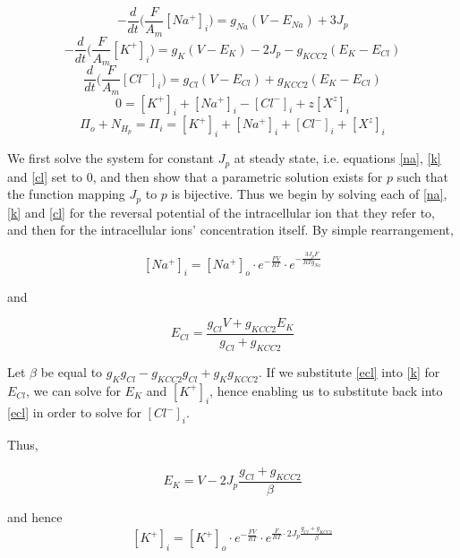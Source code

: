 \documentclass[a4paper,11pt]{article}
\begin{document}
\begin{equation} \label{na} \tag{S1}
-\frac{d}{dt}\bigg(\frac{F}{A_m}[Na^+]_i\bigg) =g_{Na}(V-E_{Na})+3J_p
\end{equation}
\begin{equation} \label{k} \tag{S2}
-\frac{d}{dt}\bigg(\frac{F}{A_m}[K^+]_i\bigg) = g_K(V-E_{K})-2J_p-g_{KCC2}(E_K-E_{Cl})
\end{equation}
\begin{equation} \label{cl} \tag{S3}
\frac{d}{dt}\bigg(\frac{F}{A_m}[Cl^-]_i\bigg) = g_{Cl}(V-E_{Cl})+g_{KCC2}(E_K-E_{Cl})
\end{equation}
\begin{equation} \label{in} \tag{S4}
0=[K^+]_i+[Na^+]_i-[Cl^-]_i+z[X^z]_i
\end{equation}
\begin{equation} \label{osmo} \tag{S5}
\Pi_o+N_{H_p} = \Pi_i=[K^+]_i+[Na^+]_i+[Cl^-]_i+[X^z]_i
\end{equation}

We first solve the system for constant $J_p$ at steady state, i.e. equations \ref{na}, \ref{k} and \ref{cl} set to 0, and then show that a parametric solution exists for $p$ such that the function mapping $J_p$ to $p$ is bijective. Thus we begin by solving each of \eqref{na}, \eqref{k} and \eqref{cl} for the reversal potential of the intracellular ion that they refer to, and then for the intracellular ions' concentration itself. By simple rearrangement,

\begin{equation} \label{nai} \tag{S6}
[Na^+]_i = [Na^+]_o \cdot e^{-\frac{FV}{RT}} \cdot e^{-\frac{3J_pF}{RTg_{Na}}} 
\end{equation}

and

\begin{equation} \label{ecl} \tag{S7}
E_{Cl} = \frac{g_{Cl}V+g_{KCC2}E_K}{g_{Cl}+g_{KCC2}}
\end{equation}

Let $\beta$ be equal to $g_Kg_{Cl}-g_{KCC2}g_{Cl}+g_Kg_{KCC2}$. If we substitute \eqref{ecl} into \eqref{k} for $E_{Cl}$, we can solve for $E_K$ and $[K^+]_i$, hence enabling us to substitute back into \eqref{ecl} in order to solve for $[Cl^-]_i$.

Thus,

\begin{equation*}
E_K = V-2J_p\frac{g_{Cl}+g_{KCC2}}{\beta}
\end{equation*}

and hence
\begin{equation} \label{ki} \tag{S8}
[K^+]_i = [K^+]_o \cdot e^{-\frac{FV}{RT}} \cdot e^{\frac{F}{RT} \cdot 2J_p\frac{g_{Cl}+g_{KCC2}}{\beta}}
\end{equation}
\end{document}
